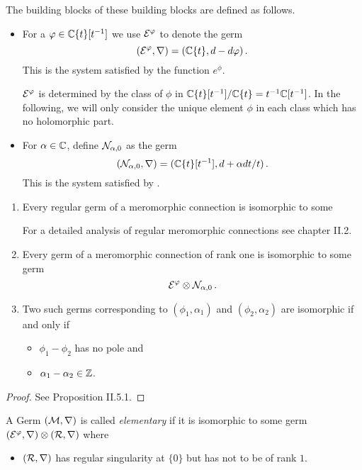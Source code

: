 The building blocks of these building blocks are defined as follows.
\begin{defn}
  \begin{itemize}
    \item For a $\varphi\in\mathbb{C}\{t\}[t^{-1}]$ we use $\mathcal{E}^{\varphi}$ to denote the germ
      \[
        (\mathcal{E}^{\varphi},\nabla)=(\mathbb{C}\{t\},d-d\varphi)\,.
      \]
      This is the system satisfied by the function $e^\phi$.
      \begin{cor}
        $\mathcal{E}^\varphi$ is determined by the class of $\phi$ in
        $\mathbb{C}\{t\}[t^{-1}]/\mathbb{C}\{t\}=t^{-1}\mathbb{C}[t^{-1}]$. In the following, we will
        only consider the unique element $\phi$ in each class which has no
        holomorphic part.
      \end{cor}
    \item For $\alpha\in\mathbb{C}$, define $\mathcal{N}_{\alpha,0}$ as the germ
      \[
        (\mathcal{N}_{\alpha,0},\nabla)=(\mathbb{C}\{t\}[t^{-1}],d+\alpha dt/t)\,.
      \]
      This is the system satisfied by \TODO{}.
  \end{itemize}
\end{defn}
\begin{prop}
  \begin{enumerate}
    \item Every regular germ of a meromorphic connection is isomorphic to some
      \TODO{}
      \begin{rem}
        For a detailed analysis of regular meromorphic connections see
        \cite{sabbah2007isomonodromic} chapter II.2.
      \end{rem}
    \item Every germ of a meromorphic connection of rank one is isomorphic to
      some germ
      \[
        \mathcal{E}^\varphi\otimes\mathcal{N}_{\alpha,0} \,.
      \]
    \item Two such germs corresponding to $(\phi_1,\alpha_1)$ and
      $(\phi_2,\alpha_2)$ are isomorphic if and only if
      \begin{itemize}
        \item $\phi_1-\phi_2$ has no pole and
        \item $\alpha_1-\alpha_2\in\mathbb{Z}$.
      \end{itemize}
  \end{enumerate}
\end{prop}
\begin{proof}
  See \cite{sabbah2007isomonodromic} Proposition II.5.1.
\end{proof}
\begin{defn}
  A Germ $(\mathcal{M},\nabla)$ is called \emph{elementary} if it is isomorphic to
  some germ $(\mathcal{E}^\varphi,\nabla)\otimes(\mathcal{R},\nabla)$ where
  \begin{itemize}
    \item $(\mathcal{R},\nabla)$ has regular singularity at $\{0\}$ but has not to be
      of rank $1$.
  \end{itemize}
\end{defn}
